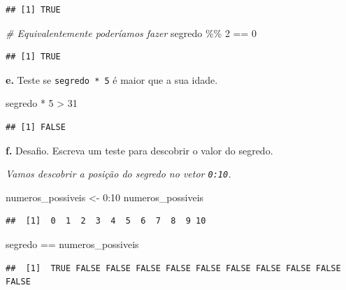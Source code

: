 \documentclass[
]{book}
\newenvironment{Shaded}{\begin{snugshade}}{\end{snugshade}}
\newcommand{\CommentTok}[1]{\textcolor[rgb]{0.56,0.35,0.01}{\textit{#1}}}
\newcommand{\DecValTok}[1]{\textcolor[rgb]{0.00,0.00,0.81}{#1}}
\newcommand{\NormalTok}[1]{#1}
\newcommand{\OtherTok}[1]{\textcolor[rgb]{0.56,0.35,0.01}{#1}}
\newcommand{\SpecialCharTok}[1]{\textcolor[rgb]{0.00,0.00,0.00}{#1}}
\begin{document}
\begin{verbatim}
## [1] TRUE
\end{verbatim}

\begin{Shaded}
\begin{Highlighting}[]
\CommentTok{\# Equivalentemente poderíamos fazer}
\NormalTok{segredo }\SpecialCharTok{\%\%} \DecValTok{2} \SpecialCharTok{==} \DecValTok{0}
\end{Highlighting}
\end{Shaded}

\begin{verbatim}
## [1] TRUE
\end{verbatim}

\textbf{e.} Teste se \texttt{segredo\ *\ 5} é maior que a sua idade.

\begin{Shaded}
\begin{Highlighting}[]
\NormalTok{segredo }\SpecialCharTok{*} \DecValTok{5} \SpecialCharTok{\textgreater{}} \DecValTok{31}
\end{Highlighting}
\end{Shaded}

\begin{verbatim}
## [1] FALSE
\end{verbatim}

\textbf{f.} Desafio. Escreva um teste para descobrir o valor do segredo.

\emph{Vamos descobrir a posição do segredo no vetor \texttt{0:10}.}

\begin{Shaded}
\begin{Highlighting}[]
\NormalTok{numeros\_possiveis }\OtherTok{\textless{}{-}} \DecValTok{0}\SpecialCharTok{:}\DecValTok{10}
\NormalTok{numeros\_possiveis}
\end{Highlighting}
\end{Shaded}

\begin{verbatim}
##  [1]  0  1  2  3  4  5  6  7  8  9 10
\end{verbatim}

\begin{Shaded}
\begin{Highlighting}[]
\NormalTok{segredo }\SpecialCharTok{==}\NormalTok{ numeros\_possiveis}
\end{Highlighting}
\end{Shaded}

\begin{verbatim}
##  [1]  TRUE FALSE FALSE FALSE FALSE FALSE FALSE FALSE FALSE FALSE FALSE
\end{verbatim}
\end{document}
